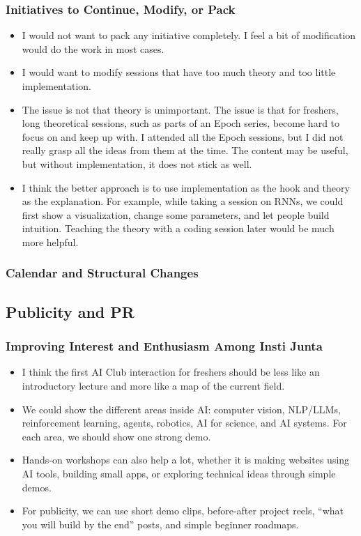 \documentclass[11pt,a4paper]{article}
\newcommand{\answergap}{\vspace{0.9em}}
\begin{document}
\subsubsection{Initiatives to Continue, Modify, or Pack}
\begin{itemize}
    \item I would not want to pack any initiative completely. I feel a bit of modification would do the work in most cases.

    \item I would want to modify sessions that have too much theory and too little implementation.

    \item The issue is not that theory is unimportant. The issue is that for freshers, long theoretical sessions, such as parts of an Epoch series, become hard to focus on and keep up with. I attended all the Epoch sessions, but I did not really grasp all the ideas from them at the time. The content may be useful, but without implementation, it does not stick as well.

    \item I think the better approach is to use implementation as the hook and theory as the explanation. For example, while taking a session on RNNs, we could first show a visualization, change some parameters, and let people build intuition. Teaching the theory with a coding session later would be much more helpful.
\end{itemize}

\subsubsection{Calendar and Structural Changes}
\answergap

\subsection{Publicity and PR}

\subsubsection{Improving Interest and Enthusiasm Among Insti Junta}
\begin{itemize}
    \item I think the first AI Club interaction for freshers should be less like an introductory lecture and more like a map of the current field.

    \item We could show the different areas inside AI: computer vision, NLP/LLMs, reinforcement learning, agents, robotics, AI for science, and AI systems. For each area, we should show one strong demo.

    \item Hands-on workshops can also help a lot, whether it is making websites using AI tools, building small apps, or exploring technical ideas through simple demos.

    \item For publicity, we can use short demo clips, before-after project reels, ``what you will build by the end'' posts, and simple beginner roadmaps.
\end{itemize}
\end{document}
